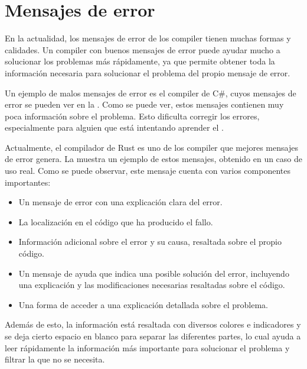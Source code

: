 \section{Mensajes de error}\label{sec:error-messages}

En la actualidad, los mensajes de error de los \gls{compiler} tienen muchas
formas y calidades. Un \gls{compiler} con buenos mensajes de error puede ayudar
mucho a solucionar los problemas más rápidamente, ya que permite obtener toda la
información necesaria para solucionar el problema del propio mensaje de error.

Un ejemplo de malos mensajes de error es el \gls{compiler} de C\#, cuyos mensajes
de error se pueden ver en la . Como se puede ver, estos
mensajes contienen muy poca información sobre el problema. Esto dificulta
corregir los errores, especialmente para alguien que está intentando aprender el
.


Actualmente, el compilador de Rust \parencite{Rust} es uno de los
compiler que mejores mensajes de error genera. La 
muestra un ejemplo de estos mensajes, obtenido en un caso de uso real. Como se
puede observar, este mensaje cuenta con varios componentes importantes:

\begin{itemize}
    \item Un mensaje de error con una explicación clara del error.
    \item La localización en el código que ha producido el fallo.
    \item Información adicional sobre el error y su causa, resaltada sobre el
    propio código.
    \item Un mensaje de ayuda que indica una posible solución del error,
    incluyendo una explicación y las modificaciones necesarias resaltadas sobre
    el código.
    \item Una forma de acceder a una explicación detallada sobre el problema.
\end{itemize}

Además de esto, la información está resaltada con diversos colores e indicadores
y se deja cierto espacio en blanco para separar las diferentes partes, lo cual
ayuda a leer rápidamente la información más importante para solucionar el
problema y filtrar la que no se necesita.


